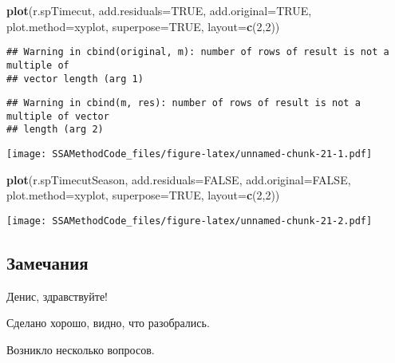 \documentclass[
]{article}
\newenvironment{Shaded}{\begin{snugshade}}{\end{snugshade}}
\newcommand{\AttributeTok}[1]{\textcolor[rgb]{0.13,0.29,0.53}{#1}}
\newcommand{\ConstantTok}[1]{\textcolor[rgb]{0.56,0.35,0.01}{#1}}
\newcommand{\DecValTok}[1]{\textcolor[rgb]{0.00,0.00,0.81}{#1}}
\newcommand{\FunctionTok}[1]{\textcolor[rgb]{0.13,0.29,0.53}{\textbf{#1}}}
\newcommand{\NormalTok}[1]{#1}
\newcommand{\StringTok}[1]{\textcolor[rgb]{0.31,0.60,0.02}{#1}}
\begin{document}
\begin{Shaded}
\begin{Highlighting}[]
\FunctionTok{plot}\NormalTok{(r.spTimecut, }\AttributeTok{add.residuals=}\ConstantTok{TRUE}\NormalTok{, }\AttributeTok{add.original=}\ConstantTok{TRUE}\NormalTok{, }\AttributeTok{plot.method=}\StringTok{\textquotesingle{}xyplot\textquotesingle{}}\NormalTok{, }\AttributeTok{superpose=}\ConstantTok{TRUE}\NormalTok{, }\AttributeTok{layout=}\FunctionTok{c}\NormalTok{(}\DecValTok{2}\NormalTok{,}\DecValTok{2}\NormalTok{))}
\end{Highlighting}
\end{Shaded}

\begin{verbatim}
## Warning in cbind(original, m): number of rows of result is not a multiple of
## vector length (arg 1)
\end{verbatim}

\begin{verbatim}
## Warning in cbind(m, res): number of rows of result is not a multiple of vector
## length (arg 2)
\end{verbatim}

\texttt{[image: SSAMethodCode\_files/figure-latex/unnamed-chunk-21-1.pdf]}

\begin{Shaded}
\begin{Highlighting}[]
\FunctionTok{plot}\NormalTok{(r.spTimecutSeason, }\AttributeTok{add.residuals=}\ConstantTok{FALSE}\NormalTok{, }\AttributeTok{add.original=}\ConstantTok{FALSE}\NormalTok{, }\AttributeTok{plot.method=}\StringTok{\textquotesingle{}xyplot\textquotesingle{}}\NormalTok{, }\AttributeTok{superpose=}\ConstantTok{TRUE}\NormalTok{, }\AttributeTok{layout=}\FunctionTok{c}\NormalTok{(}\DecValTok{2}\NormalTok{,}\DecValTok{2}\NormalTok{))}
\end{Highlighting}
\end{Shaded}

\texttt{[image: SSAMethodCode\_files/figure-latex/unnamed-chunk-21-2.pdf]}

\subsection{Замечания}\label{ux437ux430ux43cux435ux447ux430ux43dux438ux44f}

Денис, здравствуйте!

Сделано хорошо, видно, что разобрались.

Возникло несколько вопросов.
\end{document}
